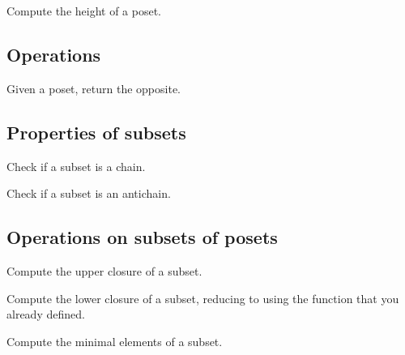 \begin{gradedexercise}
Compute the height of a poset.
\end{gradedexercise}

\subsection{Operations}


\begin{gradedexercise}
Given a poset, return the opposite.
\end{gradedexercise}

\subsection{Properties of subsets}


\begin{gradedexercise}
Check if a subset is a chain.
\end{gradedexercise}

\begin{gradedexercise}
Check if a subset is an antichain.
\end{gradedexercise}

\subsection{Operations on subsets of posets}

\begin{gradedexercise}
Compute the upper closure of a subset.

\end{gradedexercise}


\begin{gradedexercise}
Compute the lower closure of a subset, reducing to
using the function  that you
already defined.

\end{gradedexercise}



\begin{gradedexercise}
Compute the minimal elements of a subset.


\end{gradedexercise}


